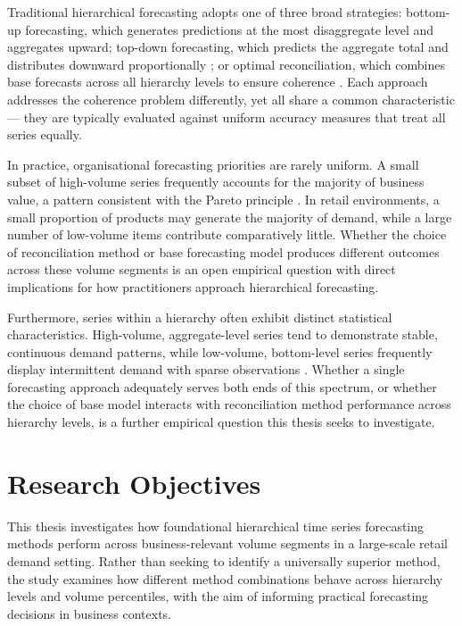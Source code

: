 Traditional hierarchical forecasting adopts one of three broad strategies: bottom-up forecasting, which generates predictions at the most disaggregate level and aggregates upward; top-down forecasting, which predicts the aggregate total and distributes downward proportionally \cite{Hyndman:2018}; or optimal reconciliation, which combines base forecasts across all hierarchy levels to ensure coherence \cite{Wickramasuriya:2019}. Each approach addresses the coherence problem differently, yet all share a common characteristic — they are typically evaluated against uniform accuracy measures that treat all series equally.

In practice, organisational forecasting priorities are rarely uniform. A small subset of high-volume series frequently accounts for the majority of business value, a pattern consistent with the Pareto principle \cite{Pareto:1896}. In retail environments, a small proportion of products may generate the majority of demand, while a large number of low-volume items contribute comparatively little. Whether the choice of reconciliation method or base forecasting model produces different outcomes across these volume segments is an open empirical question with direct implications for how practitioners approach hierarchical forecasting.



Furthermore, series within a hierarchy often exhibit distinct statistical characteristics. High-volume, aggregate-level series tend to demonstrate stable, continuous demand patterns, while low-volume, bottom-level series frequently display intermittent demand with sparse observations \cite{Syntetos:2005}. Whether a single forecasting approach adequately serves both ends of this spectrum, or whether the choice of base model interacts with reconciliation method performance across hierarchy levels, is a further empirical question this thesis seeks to investigate.

\section{Research Objectives}

This thesis investigates how foundational hierarchical time series forecasting methods perform across business-relevant volume segments in a large-scale retail demand setting. Rather than seeking to identify a universally superior method, the study examines how different method combinations behave across hierarchy levels and volume percentiles, with the aim of informing practical forecasting decisions in business contexts.

